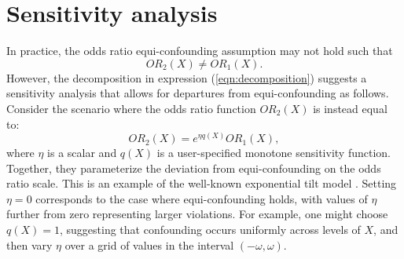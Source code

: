 \documentclass[11pt]{article}
\begin{document}
\section{Sensitivity analysis}
In practice, the odds ratio equi-confounding assumption may not hold such that
$$OR_2(X) \neq OR_1(X).$$ 
However, the decomposition in expression (\ref{eqn:decomposition}) suggests a sensitivity analysis that allows for departures from equi-confounding as follows. Consider the scenario where the odds ratio function $OR_2(X)$ is instead equal to:
\begin{equation}\label{eq:sensitivity-analysis}OR_2(X) = e^{\eta q(X)} OR_1(X), \end{equation}
where $\eta$ is a scalar and $q(X)$ is a user-specified  monotone sensitivity function. Together, they parameterize the deviation from equi-confounding on the odds ratio scale. This is an example of the well-known exponential tilt model \cite{scharfstein_adjusting_1999, liu_identification_2020}. Setting $\eta = 0$ corresponds to the case where equi-confounding holds, with values of $\eta$ further from zero representing larger violations. For example, one might choose $q(X) = 1$, suggesting that confounding occurs uniformly across levels of $X$, and then vary $\eta$ over a grid of values in the interval $(-\omega, \omega)$.


\end{document}
